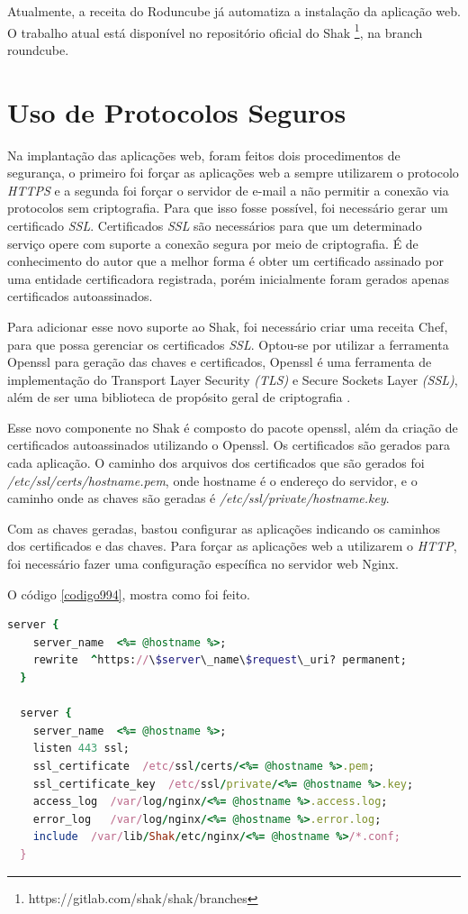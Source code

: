 Atualmente, a receita do Roduncube já automatiza a instalação da aplicação web. 
O trabalho atual está disponível no repositório oficial do Shak \footnote{https://gitlab.com/shak/shak/branches}, na branch roundcube.

\section{Uso de Protocolos Seguros}
\label{sub:seguranca}

Na implantação das aplicações web, foram feitos dois procedimentos de segurança, o primeiro
foi forçar as aplicações web a sempre utilizarem o protocolo \textit{HTTPS} e a segunda foi forçar o
servidor de e-mail a não permitir a conexão via protocolos sem criptografia. Para que 
isso fosse possível, foi necessário gerar um certificado \textit{SSL}. Certificados 
\textit{SSL} são necessários para que um determinado serviço opere com suporte 
a conexão segura por meio de criptografia.
É de conhecimento do autor que a melhor forma é obter um certificado assinado
por uma entidade certificadora registrada, porém inicialmente foram gerados apenas certificados
autoassinados.

Para adicionar esse novo suporte ao Shak, foi necessário criar uma receita Chef,
para que possa gerenciar os certificados \textit{SSL}. Optou-se por utilizar a ferramenta
Openssl para geração das chaves e certificados, Openssl é uma ferramenta de
implementação do Transport Layer Security \textit{(TLS)} e Secure Sockets Layer \textit{(SSL)},
além de ser uma biblioteca de propósito geral de criptografia \cite{openssl}.

Esse novo componente no Shak é composto do pacote openssl, além da criação
de certificados autoassinados utilizando o Openssl. Os certificados são gerados 
para cada aplicação. O caminho dos arquivos dos certificados que 
são gerados foi \textit{/etc/ssl/certs/hostname.pem}, onde hostname é o endereço 
do servidor,
e o caminho onde as chaves são geradas é \textit{/etc/ssl/private/hostname.key}.

Com as chaves geradas, bastou configurar as aplicações indicando os caminhos dos certificados
e das chaves. Para forçar as aplicações web a utilizarem o \textit{HTTP}, foi necessário fazer
uma configuração específica no servidor web Nginx. 

O código \ref{codigo994}, mostra como foi feito.

\begin{lstlisting}[basicstyle=\ttfamily,language=Ruby,label=dice_index,caption={Exemplo de arquivo de configuração do Nginx para aplicações web no shak}, label=codigo994]
  server {
    server_name  <%= @hostname %>;
    rewrite  ^https://\$server\_name\$request\_uri? permanent;
  }

  server {
    server_name  <%= @hostname %>;
    listen 443 ssl;
    ssl_certificate  /etc/ssl/certs/<%= @hostname %>.pem;
    ssl_certificate_key  /etc/ssl/private/<%= @hostname %>.key;
    access_log  /var/log/nginx/<%= @hostname %>.access.log;
    error_log   /var/log/nginx/<%= @hostname %>.error.log;
    include  /var/lib/Shak/etc/nginx/<%= @hostname %>/*.conf;
  }
\end{lstlisting}

